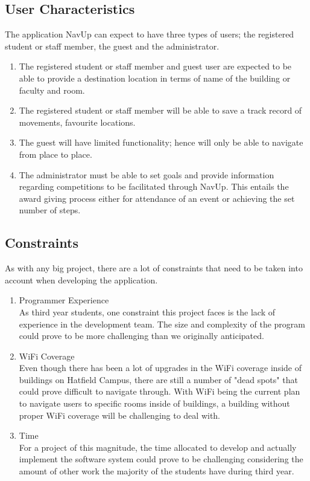 \documentclass[a4paper,10pt]{article}
\begin{document}
	\subsection{User Characteristics}
		The application NavUp can expect to have three types of users; the registered student or staff member, the guest and the administrator.
		\begin{enumerate}
		\item The registered student or staff member and guest user are expected to be able to provide a destination location in terms of name of the building or faculty and room.
		
		\item The registered student or staff member will be able to save a track record of movements, favourite locations.
		
		\item The guest will have limited functionality; hence will only be able to navigate from place to place.
		
		\item The administrator must be able to set goals and provide information regarding competitions to be facilitated through NavUp. This entails the award giving process either for attendance of an event or achieving the set number of steps.
		\end{enumerate}
	\subsection{Constraints}
	As with any big project, there are a lot of constraints that need to be taken into account when developing the application.
		\begin{enumerate}
			\item Programmer Experience \\
			As third year students, one constraint this project faces is the lack of experience in the development team. The size and complexity of the program could prove to be more challenging than we originally anticipated.
			
			\item WiFi Coverage \\
			Even though there has been a lot of upgrades in the WiFi coverage inside of buildings on Hatfield Campus, there are still a number of "dead spots" that could prove difficult to navigate through. With WiFi being the current plan to navigate users to specific rooms inside of buildings, a building without proper WiFi coverage will be challenging to deal with.
			
			\item Time \\
			For a project of this magnitude, the time allocated to develop and actually implement the software system could prove to be challenging considering the amount of other work the majority of the students have during third year.
		\end{enumerate}
\end{document}
